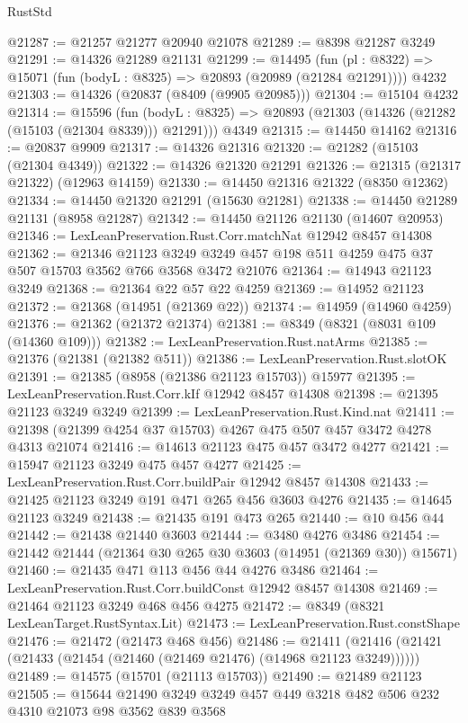 \begin{lexlean}{RustStd}
\begin{coremodule}
@21287 := @21257 @21277 @20940 @21078
@21289 := @8398 @21287 @3249
@21291 := @14326 @21289 @21131
@21299 := @14495
    (fun (pl : @8322) => @15071 (fun (bodyL : @8325) => @20893 (@20989 (@21284 @21291))))
    @4232
@21303 := @14326 (@20837 (@8409 (@9905 @20985)))
@21304 := @15104 @4232
@21314 := @15596
    (fun (bodyL : @8325) => @20893 (@21303 (@14326 (@21282 (@15103 (@21304 @8339))) @21291)))
    @4349
@21315 := @14450 @14162
@21316 := @20837 @9909
@21317 := @14326 @21316
@21320 := @21282 (@15103 (@21304 @4349))
@21322 := @14326 @21320 @21291
@21326 := @21315 (@21317 @21322) (@12963 @14159)
@21330 := @14450 @21316 @21322 (@8350 @12362)
@21334 := @14450 @21320 @21291 (@15630 @21281)
@21338 := @14450 @21289 @21131 (@8958 @21287)
@21342 := @14450 @21126 @21130 (@14607 @20953)
@21346 := LexLeanPreservation.Rust.Corr.matchNat @12942 @8457 @14308
@21362 := @21346
    @21123
    @3249
    @3249
    @457
    @198
    @511
    @4259
    @475
    @37
    @507
    @15703
    @3562
    @766
    @3568
    @3472
    @21076
@21364 := @14943 @21123 @3249
@21368 := @21364 @22 @57 @22 @4259
@21369 := @14952 @21123
@21372 := @21368 (@14951 (@21369 @22))
@21374 := @14959 (@14960 @4259)
@21376 := @21362 (@21372 @21374)
@21381 := @8349 (@8321 (@8031 @109 (@14360 @109)))
@21382 := LexLeanPreservation.Rust.natArms
@21385 := @21376 (@21381 (@21382 @511))
@21386 := LexLeanPreservation.Rust.slotOK
@21391 := @21385 (@8958 (@21386 @21123 @15703)) @15977
@21395 := LexLeanPreservation.Rust.Corr.kIf @12942 @8457 @14308
@21398 := @21395 @21123 @3249 @3249
@21399 := LexLeanPreservation.Rust.Kind.nat
@21411 := @21398 (@21399 @4254 @37 @15703) @4267 @475 @507 @457 @3472 @4278 @4313 @21074
@21416 := @14613 @21123 @475 @457 @3472 @4277
@21421 := @15947 @21123 @3249 @475 @457 @4277
@21425 := LexLeanPreservation.Rust.Corr.buildPair @12942 @8457 @14308
@21433 := @21425 @21123 @3249 @191 @471 @265 @456 @3603 @4276
@21435 := @14645 @21123 @3249
@21438 := @21435 @191 @473 @265
@21440 := @10 @456 @44
@21442 := @21438 @21440 @3603
@21444 := @3480 @4276 @3486
@21454 := @21442 @21444 (@21364 @30 @265 @30 @3603 (@14951 (@21369 @30)) @15671)
@21460 := @21435 @471 @113 @456 @44 @4276 @3486
@21464 := LexLeanPreservation.Rust.Corr.buildConst @12942 @8457 @14308
@21469 := @21464 @21123 @3249 @468 @456 @4275
@21472 := @8349 (@8321 LexLeanTarget.RustSyntax.Lit)
@21473 := LexLeanPreservation.Rust.constShape
@21476 := @21472 (@21473 @468 @456)
@21486 := @21411 (@21416 (@21421 (@21433 (@21454 (@21460 (@21469 @21476) (@14968 @21123 @3249))))))
@21489 := @14575 (@15701 (@21113 @15703))
@21490 := @21489 @21123
@21505 := @15644 @21490 @3249 @3249 @457 @449 @3218 @482 @506 @232 @4310 @21073 @98 @3562 @839 @3568

\end{coremodule}
\end{lexlean}
